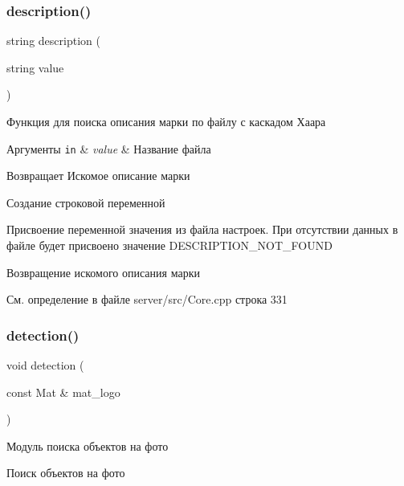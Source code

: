 \mbox{\label{group__corecpp_gaa85ae460901348b74381239ce0517d5f}} 
\subsubsection{\texorpdfstring{description()}{description()}}
{\footnotesize\ttfamily string description (\begin{DoxyParamCaption}\item[{string}]{value }\end{DoxyParamCaption})}



Функция для поиска описания марки по файлу с каскадом Хаара 


\begin{DoxyParams}[1]{Аргументы}
\mbox{\tt in}  & {\em value} & Название файла \\
\hline
\end{DoxyParams}
\begin{DoxyReturn}{Возвращает}
Искомое описание марки 
\end{DoxyReturn}
Создание строковой переменной

Присвоение переменной значения из файла настроек. При отсутствии данных в файле будет присвоено значение D\+E\+S\+C\+R\+I\+P\+T\+I\+O\+N\+\_\+\+N\+O\+T\+\_\+\+F\+O\+U\+ND

Возвращение искомого описания марки 

См. определение в файле server/src/\+Core.\+cpp строка 331

\mbox{\label{group__corecpp_gae99907f19e7f09055012f68347a57d05}} 
\subsubsection{\texorpdfstring{detection()}{detection()}}
{\footnotesize\ttfamily void detection (\begin{DoxyParamCaption}\item[{const Mat \&}]{mat\+\_\+logo }\end{DoxyParamCaption})}



Модуль поиска объектов на фото 

Поиск объектов на фото

